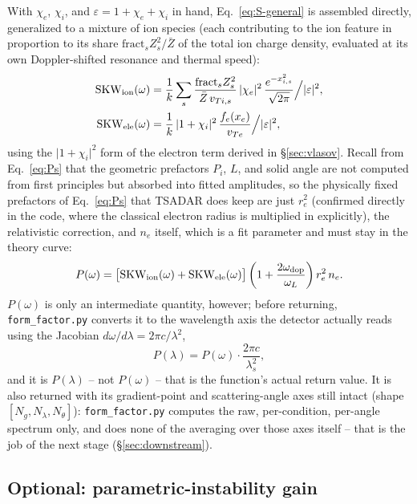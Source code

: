 \documentclass[11pt]{article}
\newcommand{\file}[1]{\texttt{#1}}
\begin{document}
With $\chi_e$, $\chi_i$, and $\varepsilon=1+\chi_e+\chi_i$ in hand, Eq.~\ref{eq:S-general}
is assembled directly, generalized to a mixture of ion species (each contributing to the
ion feature in proportion to its share $\mathrm{fract}_sZ_s^2/\bar Z$ of the total ion
charge density, evaluated at its own Doppler-shifted resonance and thermal speed):
\begin{align}
  \mathrm{SKW}_{\rm ion}(\omega) &= \frac1k\sum_s\frac{\mathrm{fract}_sZ_s^2}{\bar Z\,v_{Ti,s}}\,
    \vert\chi_e\vert^2\,\frac{e^{-x_{i,s}^2}}{\sqrt{2\pi}}\Big/\vert\varepsilon\vert^2, \\
  \mathrm{SKW}_{\rm ele}(\omega) &= \frac1k\,\vert1+\chi_i\vert^2\,\frac{f_e(x_e)}{v_{Te}}
    \Big/\vert\varepsilon\vert^2,
\end{align}
using the $\vert1+\chi_i\vert^2$ form of the electron term derived in \S\ref{sec:vlasov}.
Recall from Eq.~\ref{eq:Ps} that the geometric prefactors $P_i$, $L$, and solid angle are
not computed from first principles but absorbed into fitted amplitudes, so the physically
fixed prefactors of Eq.~\ref{eq:Ps} that TSADAR does keep are just $r_e^2$ (confirmed
directly in the code, where the classical electron radius is multiplied in explicitly),
the relativistic correction, and $n_e$ itself, which is a fit parameter and must stay in
the theory curve:
\begin{equation}
  P(\omega) = \big[\mathrm{SKW}_{\rm ion}(\omega)+\mathrm{SKW}_{\rm ele}(\omega)\big]
  \left(1+\frac{2\omega_{\rm dop}}{\omega_L}\right) r_e^2\,n_e.
\end{equation}
$P(\omega)$ is only an intermediate quantity, however; before returning,
\file{form\_factor.py} converts it to the wavelength axis the detector actually reads
using the Jacobian $d\omega/d\lambda=2\pi c/\lambda^2$,
\begin{equation}
  P(\lambda) = P(\omega)\cdot\frac{2\pi c}{\lambda_s^2},
\end{equation}
and it is $P(\lambda)$ -- not $P(\omega)$ -- that is the function's actual return value.
It is also returned with its gradient-point and scattering-angle axes still intact (shape
$[N_g,N_\lambda,N_\theta]$): \file{form\_factor.py} computes the raw, per-condition,
per-angle spectrum only, and does none of the averaging over those axes itself -- that is
the job of the next stage (\S\ref{sec:downstream}).

\subsection{Optional: parametric-instability gain}
\end{document}
